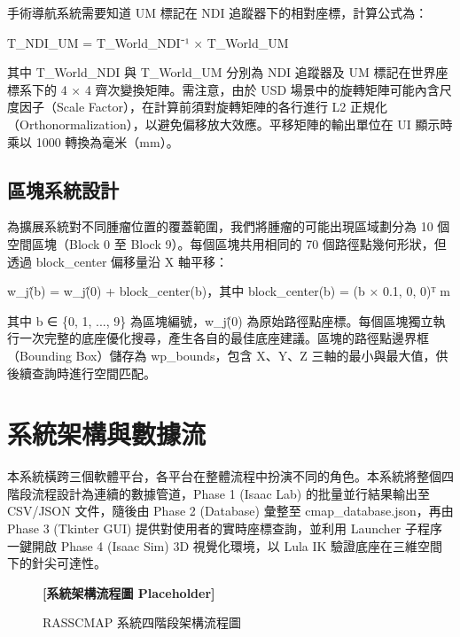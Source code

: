 \documentclass[a4paper, 12pt]{article}
\begin{document}
手術導航系統需要知道 UM 標記在 NDI 追蹤器下的相對座標，計算公式為：
\begin{center}
T\_NDI\_UM = T\_World\_NDI⁻¹ × T\_World\_UM
\end{center}
其中 T\_World\_NDI 與 T\_World\_UM 分別為 NDI 追蹤器及 UM 標記在世界座標系下的 4 × 4 齊次變換矩陣。需注意，由於 USD 場景中的旋轉矩陣可能內含尺度因子（Scale Factor），在計算前須對旋轉矩陣的各行進行 L2 正規化（Orthonormalization），以避免偏移放大效應。平移矩陣的輸出單位在 UI 顯示時乘以 1000 轉換為毫米（mm）。

\subsection{區塊系統設計}
\label{subsec:blocks}

為擴展系統對不同腫瘤位置的覆蓋範圍，我們將腫瘤的可能出現區域劃分為 10 個空間區塊（Block 0 至 Block 9）。每個區塊共用相同的 70 個路徑點幾何形狀，但透過 block\_center 偏移量沿 X 軸平移：
\begin{center}
w\_j\^(b) = w\_j\^(0) + block\_center(b)，其中 block\_center(b) = (b × 0.1, 0, 0)ᵀ m
\end{center}
其中 b ∈ \{0, 1, ..., 9\} 為區塊編號，w\_j\^(0) 為原始路徑點座標。每個區塊獨立執行一次完整的底座優化搜尋，產生各自的最佳底座建議。區塊的路徑點邊界框（Bounding Box）儲存為 wp\_bounds，包含 X、Y、Z 三軸的最小與最大值，供後續查詢時進行空間匹配。

\section{系統架構與數據流}
\label{sec:architecture}

本系統橫跨三個軟體平台，各平台在整體流程中扮演不同的角色。本系統將整個四階段流程設計為連續的數據管道，Phase 1 (Isaac Lab) 的批量並行結果輸出至 CSV/JSON 文件，隨後由 Phase 2 (Database) 彙整至 cmap\_database.json，再由 Phase 3 (Tkinter GUI) 提供對使用者的實時座標查詢，並利用 Launcher 子程序一鍵開啟 Phase 4 (Isaac Sim) 3D 視覺化環境，以 Lula IK 驗證底座在三維空間下的針尖可達性。

\begin{figure}[H]
    \centering
    \textbf{[系統架構流程圖 Placeholder]}
    \caption{RASSCMAP 系統四階段架構流程圖}
    \label{fig:architecture}
\end{figure}
\end{document}

